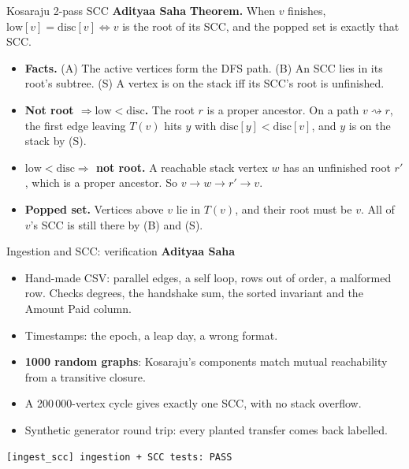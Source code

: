 \documentclass[aspectratio=169,11pt]{beamer}
\newcommand{\memberbadge}[1]{%
  \hfill{\small\bfseries\color{memberred}#1}%
}
\begin{document}
\begin{frame}{Kosaraju 2-pass SCC \memberbadge{Adityaa Saha}}
\textbf{Theorem.} When $v$ finishes, $\text{low}[v] = \text{disc}[v] \iff v$ is the root of its SCC, and the popped set is exactly that SCC.

\vspace{0.3cm}
\begin{itemize}
\setlength{\itemsep}{0.55em}
\item \textbf{Facts.} (A) The active vertices form the DFS path. (B) An SCC lies in its root's subtree. (S) A vertex is on the stack iff its SCC's root is unfinished.
\item \textbf{Not root $\Rightarrow \text{low} < \text{disc}$.} The root $r$ is a proper ancestor. On a path $v \rightsquigarrow r$, the first edge leaving $T(v)$ hits $y$ with $\text{disc}[y] < \text{disc}[v]$, and $y$ is on the stack by (S).
\item \textbf{$\text{low} < \text{disc} \Rightarrow$ not root.} A reachable stack vertex $w$ has an unfinished root $r'$, which is a proper ancestor. So $v \to w \to r' \to v$.
\item \textbf{Popped set.} Vertices above $v$ lie in $T(v)$, and their root must be $v$. All of $v$'s SCC is still there by (B) and (S).
\end{itemize}
\end{frame}

\begin{frame}{Ingestion and SCC: verification \memberbadge{Adityaa Saha}}
\begin{itemize}
\setlength{\itemsep}{0.5em}
\item Hand-made CSV: parallel edges, a self loop, rows out of order, a malformed row. Checks degrees, the handshake sum, the sorted invariant and the Amount Paid column.
\item Timestamps: the epoch, a leap day, a wrong format.
\item \textbf{1000 random graphs}: Kosaraju's components match mutual reachability from a transitive closure.
\item A 200\,000-vertex cycle gives exactly one SCC, with no stack overflow.
\item Synthetic generator round trip: every planted transfer comes back labelled.
\end{itemize}

\vspace{0.35cm}
\centering
\colorbox{softbg}{\texttt{[ingest\_scc] ingestion + SCC tests: PASS}}
\end{frame}
\end{document}
